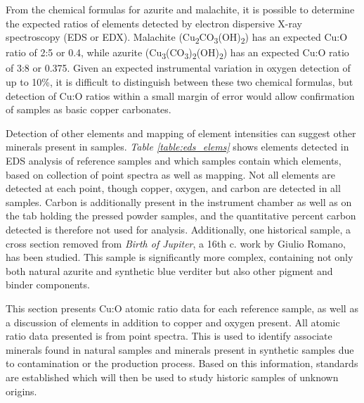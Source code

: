 From the chemical formulas for azurite and malachite, it is possible to determine the expected ratios of elements detected by electron dispersive X-ray spectroscopy (EDS or EDX). Malachite (Cu\textsubscript{2}CO\textsubscript{3}(OH)\textsubscript{2}) has an expected Cu:O ratio of 2:5 or 0.4, while azurite (Cu\textsubscript{3}(CO\textsubscript{3})\textsubscript{2}(OH)\textsubscript{2}) has an expected Cu:O ratio of 3:8 or 0.375. Given an expected instrumental variation in oxygen detection of up to 10\%, it is difficult to distinguish between these two chemical formulas, but detection of Cu:O ratios within a small margin of error would allow confirmation of samples as basic copper carbonates.

Detection of other elements and mapping of element intensities can suggest other minerals present in samples. \textit{Table \ref{table:eds_elems}} shows elements detected in EDS analysis of reference samples and which samples contain which elements, based on collection of point spectra as well as mapping. Not all elements are detected at each point, though copper, oxygen, and carbon are detected in all samples. Carbon is additionally present in the instrument chamber as well as on the tab holding the pressed powder samples, and the quantitative percent carbon detected is therefore not used for analysis. Additionally, one historical sample, a cross section removed from \textit{Birth of Jupiter}, a 16th c. work by Giulio Romano, has been studied. This sample is significantly more complex, containing not only both natural azurite and synthetic blue verditer but also other pigment and binder components.

This section presents Cu:O atomic ratio data for each reference sample, as well as a discussion of elements in addition to copper and oxygen present. All atomic ratio data presented is from point spectra. This is used to identify associate minerals found in natural samples and minerals present in synthetic samples due to contamination or the production process. Based on this information, standards are established which will then be used to study historic samples of unknown origins.

